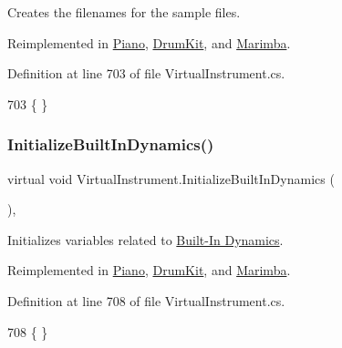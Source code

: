 Creates the filenames for the sample files. 



Reimplemented in \hyperlink{group___piano_virt_func_gaafd50f0f04ea7ea4f560accc628b8f1b}{Piano}, \hyperlink{group___drum_virt_func_ga25bb92cf56bc1b3434465faf73cd09cf}{Drum\+Kit}, and \hyperlink{group___mar_virt_func_gae57d9737fd07708dc7e13e74ee777878}{Marimba}.



Definition at line 703 of file Virtual\+Instrument.\+cs.


\begin{DoxyCode}
703 \{ \}
\end{DoxyCode}
\mbox{\label{group___v_i_base_virt_func_ga995456c03ee54543b285188c51c29a07}} 
\subsubsection{\texorpdfstring{Initialize\+Built\+In\+Dynamics()}{InitializeBuiltInDynamics()}}
{\footnotesize\ttfamily virtual void Virtual\+Instrument.\+Initialize\+Built\+In\+Dynamics (\begin{DoxyParamCaption}{ }\end{DoxyParamCaption})\hspace{0.3cm}{\ttfamily [protected]}, {\ttfamily [virtual]}}



Initializes variables related to \hyperlink{group___audio_DefBID}{Built-\/\+In Dynamics}. 



Reimplemented in \hyperlink{group___piano_virt_func_ga6bc02528f8808b8a30aa7d5776445a6d}{Piano}, \hyperlink{group___drum_virt_func_gad14c6155e6ec62f26a30261e273d6379}{Drum\+Kit}, and \hyperlink{group___mar_virt_func_ga293d829cb8571c21452c23e90968b2d8}{Marimba}.



Definition at line 708 of file Virtual\+Instrument.\+cs.


\begin{DoxyCode}
708 \{ \}
\end{DoxyCode}
